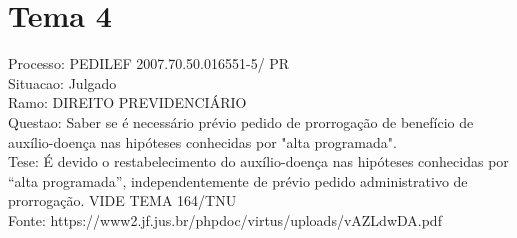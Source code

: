 \documentclass[12pt]{article}
\begin{document}
\section*{Tema 4}
Processo: PEDILEF 2007.70.50.016551-5/ PR\\
Situacao: Julgado\\
Ramo: DIREITO PREVIDENCIÁRIO\\
Questao: Saber se é necessário prévio pedido de prorrogação de benefício de auxílio-doença nas hipóteses conhecidas por "alta programada".\\
Tese: É devido o restabelecimento do auxílio-doença nas hipóteses conhecidas por “alta programada”, independentemente de prévio pedido administrativo de prorrogação. VIDE TEMA 164/TNU\\
Fonte: https://www2.jf.jus.br/phpdoc/virtus/uploads/vAZLdwDA.pdf
\end{document}
